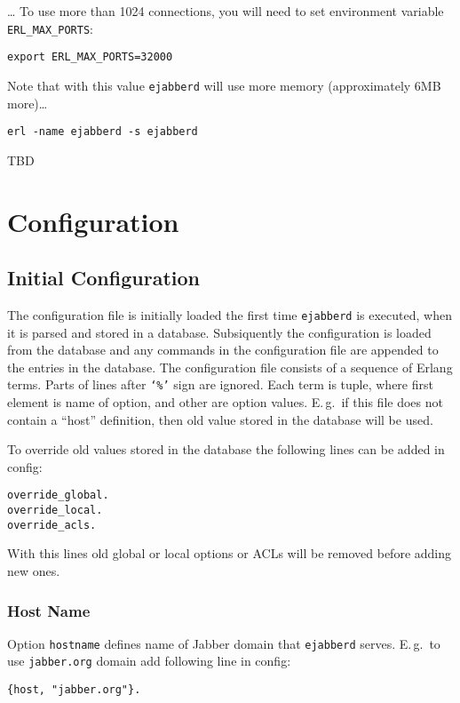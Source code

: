 \documentclass[10pt]{article}
\newcommand{\ejabberd}{\texttt{ejabberd}}
\newcommand{\Jabber}{Jabber}
\begin{document}
\ldots{} To use more than 1024 connections, you will need to set environment
variable \texttt{ERL\_MAX\_PORTS}:
\begin{verbatim}
export ERL_MAX_PORTS=32000
\end{verbatim}
Note that with this value \ejabberd{} will use more memory (approximately 6MB
more)\ldots{}

\begin{verbatim}
erl -name ejabberd -s ejabberd
\end{verbatim}

TBD

\section{Configuration}
\label{sec:configuration}

\subsection{Initial Configuration}
\label{sec:initconfig}

%

The configuration file is initially loaded the first time \ejabberd{} is
executed, when it is parsed and stored in a database.  Subsiquently the
configuration is loaded from the database and any commands in the configuration
file are appended to the entries in the database.  The configuration file
consists of a sequence of Erlang terms. Parts of lines after \texttt{`\%'} sign
are ignored.  Each term is tuple, where first element is name of option, and
other are option values. E.\,g.\ if this file does not contain a ``host''
definition, then old value stored in the database will be used.


To override old values stored in the database the following lines can be added
in config:
\begin{verbatim}
override_global.
override_local.
override_acls.
\end{verbatim}
With this lines old global or local options or ACLs will be removed before
adding new ones.


\subsubsection{Host Name}
\label{sec:confighostname}

Option \texttt{hostname} defines name of \Jabber{} domain that \ejabberd{}
serves.  E.\,g.\ to use \texttt{jabber.org} domain add following line in config:
\begin{verbatim}
{host, "jabber.org"}.
\end{verbatim}
\end{document}
